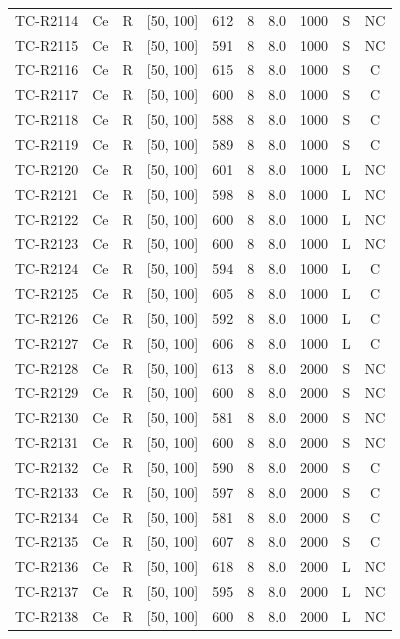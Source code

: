 \begin{longtable}{lccccccccc}
TC-R2114 & Ce & R & [50, 100] & 612 & 8 & 8.0 & 1000 & S & NC \\
TC-R2115 & Ce & R & [50, 100] & 591 & 8 & 8.0 & 1000 & S & NC \\
TC-R2116 & Ce & R & [50, 100] & 615 & 8 & 8.0 & 1000 & S & C \\
TC-R2117 & Ce & R & [50, 100] & 600 & 8 & 8.0 & 1000 & S & C \\
TC-R2118 & Ce & R & [50, 100] & 588 & 8 & 8.0 & 1000 & S & C \\
TC-R2119 & Ce & R & [50, 100] & 589 & 8 & 8.0 & 1000 & S & C \\
TC-R2120 & Ce & R & [50, 100] & 601 & 8 & 8.0 & 1000 & L & NC \\
TC-R2121 & Ce & R & [50, 100] & 598 & 8 & 8.0 & 1000 & L & NC \\
TC-R2122 & Ce & R & [50, 100] & 600 & 8 & 8.0 & 1000 & L & NC \\
TC-R2123 & Ce & R & [50, 100] & 600 & 8 & 8.0 & 1000 & L & NC \\
TC-R2124 & Ce & R & [50, 100] & 594 & 8 & 8.0 & 1000 & L & C \\
TC-R2125 & Ce & R & [50, 100] & 605 & 8 & 8.0 & 1000 & L & C \\
TC-R2126 & Ce & R & [50, 100] & 592 & 8 & 8.0 & 1000 & L & C \\
TC-R2127 & Ce & R & [50, 100] & 606 & 8 & 8.0 & 1000 & L & C \\
TC-R2128 & Ce & R & [50, 100] & 613 & 8 & 8.0 & 2000 & S & NC \\
TC-R2129 & Ce & R & [50, 100] & 600 & 8 & 8.0 & 2000 & S & NC \\
TC-R2130 & Ce & R & [50, 100] & 581 & 8 & 8.0 & 2000 & S & NC \\
TC-R2131 & Ce & R & [50, 100] & 600 & 8 & 8.0 & 2000 & S & NC \\
TC-R2132 & Ce & R & [50, 100] & 590 & 8 & 8.0 & 2000 & S & C \\
TC-R2133 & Ce & R & [50, 100] & 597 & 8 & 8.0 & 2000 & S & C \\
TC-R2134 & Ce & R & [50, 100] & 581 & 8 & 8.0 & 2000 & S & C \\
TC-R2135 & Ce & R & [50, 100] & 607 & 8 & 8.0 & 2000 & S & C \\
TC-R2136 & Ce & R & [50, 100] & 618 & 8 & 8.0 & 2000 & L & NC \\
TC-R2137 & Ce & R & [50, 100] & 595 & 8 & 8.0 & 2000 & L & NC \\
TC-R2138 & Ce & R & [50, 100] & 600 & 8 & 8.0 & 2000 & L & NC \\

\end{longtable}
